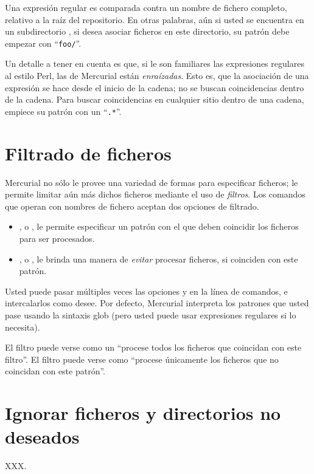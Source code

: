 Una expresión regular es comparada contra un nombre de fichero
completo, relativo a la raíz del repositorio. En otras palabras, aún
si usted se encuentra en un subdirectorio , si desea
asociar ficheros en este directorio, su patrón debe empezar con
``\texttt{foo/}''.

Un detalle a tener en cuenta es que, si le son familiares las
expresiones regulares al estilo Perl, las de Mercurial están
\emph{enraízadas}. Esto es, que la asociación de una expresión se hace
desde el inicio de la cadena; no se buscan coincidencias dentro de la
cadena. Para buscar coincidencias en cualquier sitio dentro de una
cadena, empiece su patrón con un ``\texttt{.*}''.

\section{Filtrado de ficheros}

Mercurial no sólo le provee una variedad de formas para especificar
ficheros; le permite limitar aún más dichos ficheros mediante el uso
de \emph{filtros}. Los comandos que operan con nombres de fichero
aceptan dos opciones de filtrado.
\begin{itemize}
\item {}, o , le permite especificar un
    patrón con el que deben coincidir los ficheros para ser
    procesados.
\item {}, o , le brinda una manera de 
  \emph{evitar} procesar ficheros, si coinciden con este patrón.
\end{itemize}
Usted puede pasar múltiples veces las opciones  y
 en la línea de comandos, e intercalarlos como desee.
Por defecto, Mercurial interpreta los patrones que usted pase usando
la sintaxis glob (pero usted puede usar expresiones regulares si lo
necesita).

El filtro  puede verse como un ``procese todos los ficheros
que coincidan con este filtro''.
El filtro  puede verse como ``procese únicamente los
ficheros que no coincidan con este patrón''.

\section{Ignorar ficheros y directorios no deseados}

XXX.

